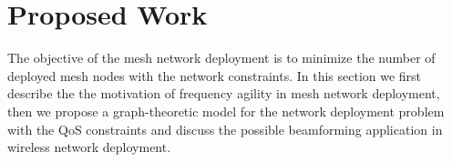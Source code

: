 \chapter{Proposed Work} 
\label{ch:futurework}

The objective of the mesh network deployment is to minimize the number of 
deployed mesh nodes with the network constraints. In this section we first 
describe the the motivation of frequency agility in mesh network deployment, 
then we propose a graph-theoretic model for the network deployment problem
with the QoS constraints and discuss the possible beamforming application in
wireless network deployment. 

%
